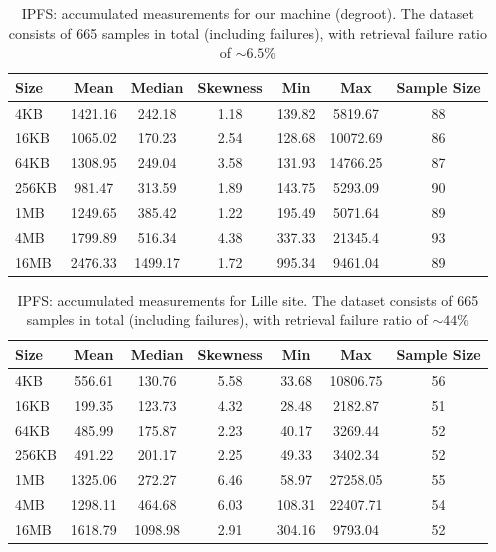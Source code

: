 \begin{table}[H]
\centering
\begin{small}
\caption{IPFS: accumulated measurements for our machine (degroot). The dataset consists of 665 samples in total (including failures), with retrieval failure ratio of $\sim 6.5\%$ }
\begin{tabular}{@{}lcccccc@{}}
\toprule
Size & Mean & Median & Skewness & Min & Max & Sample Size \\ \midrule
4KB & 1421.16 & 242.18 & 1.18 & 139.82 & 5819.67 & 88\\
16KB & 1065.02 & 170.23 & 2.54 & 128.68 & 10072.69 & 86\\
64KB & 1308.95 & 249.04 & 3.58 & 131.93 & 14766.25 & 87\\
256KB & 981.47 & 313.59 & 1.89 & 143.75 & 5293.09 & 90\\
1MB & 1249.65 & 385.42 & 1.22 & 195.49 & 5071.64 & 89\\
4MB & 1799.89 & 516.34 & 4.38 & 337.33 & 21345.4 & 93\\
16MB & 2476.33 & 1499.17 & 1.72 & 995.34 & 9461.04 & 89\\
\bottomrule
\end{tabular}
\end{small}
\end{table}

\begin{table}[H]
\centering
\begin{small}
\caption{IPFS: accumulated measurements for Lille site. The dataset consists of 665 samples in total (including failures), with retrieval failure ratio of $\sim 44\%$ }
\begin{tabular}{@{}lcccccc@{}}
\toprule
Size & Mean & Median & Skewness & Min & Max & Sample Size \\ \midrule
4KB & 556.61 & 130.76 & 5.58 & 33.68 & 10806.75 & 56\\
16KB & 199.35 & 123.73 & 4.32 & 28.48 & 2182.87 & 51\\
64KB & 485.99 & 175.87 & 2.23 & 40.17 & 3269.44 & 52\\
256KB & 491.22 & 201.17 & 2.25 & 49.33 & 3402.34 & 52\\
1MB & 1325.06 & 272.27 & 6.46 & 58.97 & 27258.05 & 55\\
4MB & 1298.11 & 464.68 & 6.03 & 108.31 & 22407.71 & 54\\
16MB & 1618.79 & 1098.98 & 2.91 & 304.16 & 9793.04 & 52\\
\bottomrule
\end{tabular}
\end{small}
\end{table}





